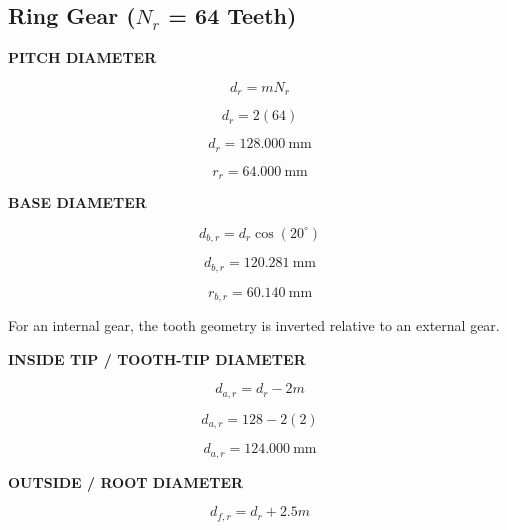 \documentclass{article}
\begin{document}
\newpage

\subsection{\textbf{Ring Gear ($N_r$ = 64 Teeth)}}

\textbf{PITCH DIAMETER}

\begin{equation}
d_r = mN_r
\end{equation}

\begin{equation}
d_r = 2(64)
\end{equation}

\begin{equation}
d_r = 128.000\ \mathrm{mm}
\end{equation}

\begin{equation}
r_r = 64.000\ \mathrm{mm}
\end{equation}

\textbf{BASE DIAMETER}

\begin{equation}
d_{b,r} = d_r\cos(20^\circ)
\end{equation}

\begin{equation}
d_{b,r} = 120.281\ \mathrm{mm}
\end{equation}

\begin{equation}
r_{b,r} = 60.140\ \mathrm{mm}
\end{equation}

For an internal gear, the tooth geometry is inverted relative to
an external gear.

\textbf{INSIDE TIP / TOOTH-TIP DIAMETER}

\begin{equation}
d_{a,r} = d_r - 2m
\end{equation}

\begin{equation}
d_{a,r} = 128 - 2(2)
\end{equation}

\begin{equation}
d_{a,r} = 124.000\ \mathrm{mm}
\end{equation}

\textbf{OUTSIDE / ROOT DIAMETER}

\begin{equation}
d_{f,r} = d_r + 2.5m
\end{equation}
\end{document}
